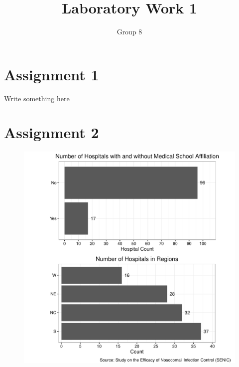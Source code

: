 \documentclass[11pt]{article}
\begin{document}
\author{Group 8}
\title{Laboratory Work 1}
\maketitle

\section{Assignment 1}
Write something here



\section{Assignment 2}

\begin{figure}[ht]
  \centering
  \includegraphics[scale=0.8]{qualitative_vars.pdf}
  \label{fig:qualivars}
\end{figure}
\end{document}
